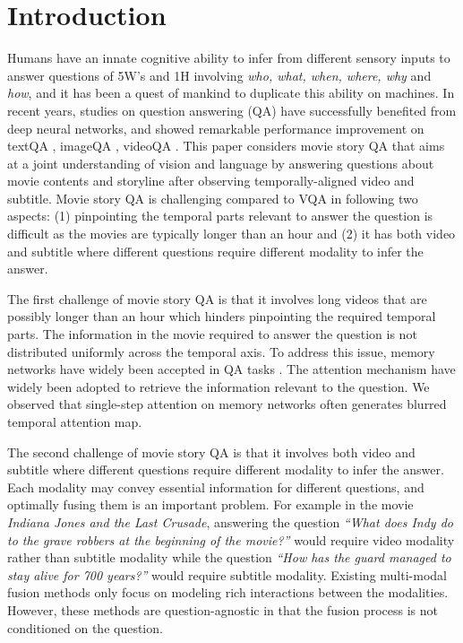 \documentclass[10pt,twocolumn,letterpaper]{article}
\begin{document}
\section{Introduction}
\label{sec:1}
Humans have an innate cognitive ability to infer from different sensory inputs to answer questions of 5W's and 1H involving \textit{who, what, when, where, why} and \textit{how}, and it has been a quest of mankind to duplicate this ability on machines. In recent years, studies on question answering (QA) have successfully benefited from deep neural networks, and showed remarkable performance improvement on textQA \cite{e2ememory,memory}, imageQA \cite{Anderson2017up-down,antol2015vqa,malinowski2015ask,SAN}, videoQA \cite{motion-appearance,jang-CVPR-2017,Yu_2018_ECCV,zhu2017uncovering}. This paper considers movie story QA \cite{mdam,fvta,rwmn,MovieQA,lmn} that aims at a joint understanding of vision and language by answering questions about movie contents and storyline after observing temporally-aligned video and subtitle. Movie story QA is challenging compared to VQA in following two aspects: (1) pinpointing the temporal parts relevant to answer the question is difficult as the movies are typically longer than an hour and (2) it has both video and subtitle where different questions require different modality to infer the answer.


The first challenge of movie story QA is that it involves long videos that are possibly longer than an hour which hinders pinpointing the required temporal parts. The information in the movie required to answer the question is not distributed uniformly across the temporal axis. To address this issue, memory networks \cite{e2ememory} have widely been accepted in QA tasks \cite{rwmn,e2ememory,MovieQA,memory}. The attention mechanism have widely been adopted to retrieve the information relevant to the question. We observed that single-step attention on memory networks \cite{rwmn,MovieQA} often generates blurred temporal attention map.


The second challenge of movie story QA is that it involves both video and subtitle where different questions require different modality to infer the answer. Each modality may convey essential information for different questions, and optimally fusing them is an important problem. For example in the movie \textit{Indiana Jones and the Last Crusade}, answering the question \textit{\textquotedblleft What does Indy do to the grave robbers at the beginning of the movie?\textquotedblright} would require video modality rather than subtitle modality while the question \textit{\textquotedblleft How has the guard managed to stay alive for 700 years?\textquotedblright} would require subtitle modality. Existing multi-modal fusion methods \cite{mcb,MLB,mdam} only focus on modeling rich interactions between the modalities. However, these methods are question-agnostic in that the fusion process is not conditioned on the question. 
\end{document}
